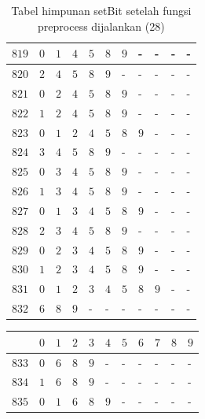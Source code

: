 \begin{appendices}
\begin{table}[H]
\begin{tabular} {|l|l|l|l|l|l|l|l|l|l|l|}
  		$ 819 $ & $ 0 $ &$ 1 $ &$ 4 $ &$ 5 $ &$ 8 $ &$ 9 $ & - &  - &  - &  -   \\ \hline
  		$ 820 $ & $ 2 $ &$ 4 $ &$ 5 $ &$ 8 $ &$ 9 $ & - &  - &  - &  - &  -   \\ \hline
  		$ 821 $ & $ 0 $ &$ 2 $ &$ 4 $ &$ 5 $ &$ 8 $ &$ 9 $ & - &  - &  - &  -   \\ \hline
  		$ 822 $ & $ 1 $ &$ 2 $ &$ 4 $ &$ 5 $ &$ 8 $ &$ 9 $ & - &  - &  - &  -   \\ \hline
  		$ 823 $ & $ 0 $ &$ 1 $ &$ 2 $ &$ 4 $ &$ 5 $ &$ 8 $ &$ 9 $ & - &  - &  -   \\ \hline
  		$ 824 $ & $ 3 $ &$ 4 $ &$ 5 $ &$ 8 $ &$ 9 $ & - &  - &  - &  - &  -   \\ \hline
  		$ 825 $ & $ 0 $ &$ 3 $ &$ 4 $ &$ 5 $ &$ 8 $ &$ 9 $ & - &  - &  - &  -   \\ \hline
  		$ 826 $ & $ 1 $ &$ 3 $ &$ 4 $ &$ 5 $ &$ 8 $ &$ 9 $ & - &  - &  - &  -   \\ \hline
  		$ 827 $ & $ 0 $ &$ 1 $ &$ 3 $ &$ 4 $ &$ 5 $ &$ 8 $ &$ 9 $ & - &  - &  -   \\ \hline
  		$ 828 $ & $ 2 $ &$ 3 $ &$ 4 $ &$ 5 $ &$ 8 $ &$ 9 $ & - &  - &  - &  -   \\ \hline
  		$ 829 $ & $ 0 $ &$ 2 $ &$ 3 $ &$ 4 $ &$ 5 $ &$ 8 $ &$ 9 $ & - &  - &  -   \\ \hline
  		$ 830 $ & $ 1 $ &$ 2 $ &$ 3 $ &$ 4 $ &$ 5 $ &$ 8 $ &$ 9 $ & - &  - &  -   \\ \hline
  		$ 831 $ & $ 0 $ &$ 1 $ &$ 2 $ &$ 3 $ &$ 4 $ &$ 5 $ &$ 8 $ &$ 9 $ & - &  -   \\ \hline
  		$ 832 $ & $ 6 $ &$ 8 $ &$ 9 $ & - &  - &  - &  - &  - &  - &  -   \\ \hline  		
  	\end{tabular}\caption{Tabel himpunan setBit setelah fungsi preprocess dijalankan (28)}
  	\label{tab:setbit_28}
  \end{table}
  \begin{table}[H]
  	\centering
  	\begin{tabular} {|l|l|l|l|l|l|l|l|l|l|l|} \hline
  		\backslashbox{$Num$}{$index$} & $ 0 $ & $ 1 $ & $ 2 $ & $ 3 $ & $ 4 $ & $ 5 $ & $ 6 $ & $ 7 $ & $ 8 $ & $ 9 $ \\ \hline
  		$ 833 $ & $ 0 $ &$ 6 $ &$ 8 $ &$ 9 $ & - &  - &  - &  - &  - &  -   \\ \hline
  		$ 834 $ & $ 1 $ &$ 6 $ &$ 8 $ &$ 9 $ & - &  - &  - &  - &  - &  -   \\ \hline
  		$ 835 $ & $ 0 $ &$ 1 $ &$ 6 $ &$ 8 $ &$ 9 $ & - &  - &  - &  - &  -   \\ \hline

\end{tabular}
\end{table}
\end{appendices}
